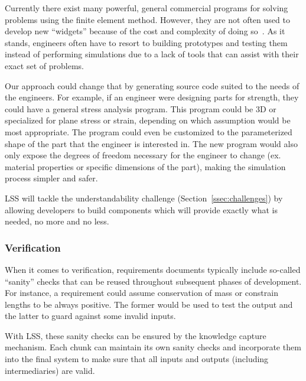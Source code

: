 \documentclass{sig-alternate-05-2015}
\newcommand{\lss}{LSS}
\begin{document}
Currently there exist many powerful, general commercial programs for solving
problems using the finite element method. However, they are not often used to
develop new ``widgets'' because of the cost and complexity of doing
so~\cite{TODO}. %
As it stands, engineers often have to resort to building prototypes and testing
them instead of performing simulations due to a lack of tools that can assist
with their exact set of problems. %

Our approach could change that by generating source code suited to the needs of
the engineers. For example, if an engineer were designing parts for strength,
they could have a general stress analysis program. This program could be 3D or
specialized for plane stress or strain, depending on which assumption would be
most appropriate. The program could even be customized to the parameterized
shape of the part that the engineer is interested in. The new program would also
only expose the degrees of freedom necessary for the engineer to change (ex.
material properties or specific dimensions of the part), making the simulation
process simpler and safer.

\lss{} will tackle the understandability challenge (Section~\ref{ssec:challenges})
by allowing developers to build components which will provide exactly what is
needed, no more and no less.

\subsubsection{Verification} \label{sssec:adv_verify}

When it comes to verification, requirements documents typically include
so-called ``sanity'' checks that can be reused throughout subsequent phases of
development. For instance, a requirement could assume conservation of mass or
constrain lengths to be always positive. The former would be used to test the
output and the latter to guard against some invalid inputs.

With \lss, these sanity checks can be ensured by the knowledge capture
mechanism. Each chunk can maintain its own sanity checks and incorporate them
into the final system to make sure that all inputs and outputs (including
intermediaries) are valid.

\end{document}

